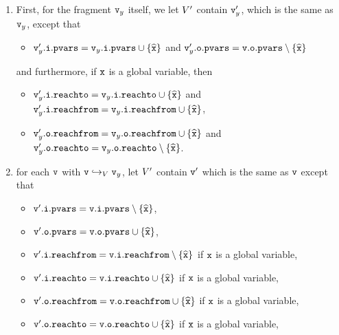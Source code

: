 \begin{enumerate}
\item
First, for the fragment $\mathtt{v}_y$ itself, we let $V'$ contain
$\mathtt{v}_y'$, which is the same as $\mathtt{v}_y$, except that
\begin{itemize}
\item $\mathtt{v}_y'.\mathtt{i}.\mathtt{pvars} = \mathtt{v}_y.\mathtt{i}.\mathtt{pvars} \cup \left\{\widehat{\mathtt{x}}\right\}$ and
  $\mathtt{v}_y'.\mathtt{o}.\mathtt{pvars} = \mathtt{v}.\mathtt{o}.\mathtt{pvars} \setminus \left\{\widehat{\mathtt{x}}\right\}$
\end{itemize}
and furthermore, if $\mathtt{x}$ is a global variable, then
{\small
  \begin{itemize}
\item $\mathtt{v}_y'.\mathtt{i}.\mathtt{reachto} = \mathtt{v}_y.\mathtt{i}.\mathtt{reachto} \cup \left\{\widehat{\mathtt{x}}\right\}$ and
$\mathtt{v}_y'.\mathtt{i}.\mathtt{reachfrom} = \mathtt{v}_y.\mathtt{i}.\mathtt{reachfrom} \cup \left\{\widehat{\mathtt{x}}\right\}$,
\item $\mathtt{v}_y'.\mathtt{o}.\mathtt{reachfrom} = \mathtt{v}_y.\mathtt{o}.\mathtt{reachfrom} \cup \left\{\widehat{\mathtt{x}}\right\}$ and
$\mathtt{v}_y'.\mathtt{o}.\mathtt{reachto} = \mathtt{v}_y.\mathtt{o}.\mathtt{reachto} \setminus \left\{\widehat{\mathtt{x}}\right\}$.
\end{itemize}
}
\item  for each $\mathtt{v}$ with $\mathtt{v} \hookrightarrow_{V} \mathtt{v}_y$, let $V'$ contain $\mathtt{v}'$ which is the same as $\mathtt{v}$ except that
\begin{itemize}
\item $\mathtt{v}'.\mathtt{i}.\mathtt{pvars} = \mathtt{v}.\mathtt{i}.\mathtt{pvars} \setminus \left\{\widehat{\mathtt{x}}\right\}$,
\item $\mathtt{v}'.\mathtt{o}.\mathtt{pvars} = \mathtt{v}.\mathtt{o}.\mathtt{pvars} \cup \left\{\widehat{\mathtt{x}}\right\}$,
\item $\mathtt{v}'.\mathtt{i}.\mathtt{reachfrom} = \mathtt{v}.\mathtt{i}.\mathtt{reachfrom} \setminus \left\{\widehat{\mathtt{x}}\right\}$ if $\tt x$ is a global variable,
\item $\mathtt{v}'.\mathtt{i}.\mathtt{reachto} = \mathtt{v}.\mathtt{i}.\mathtt{reachto} \cup \left\{\widehat{\mathtt{x}}\right\}$ if $\tt x$ is a global variable,
 \item $\mathtt{v}'.\mathtt{o}.\mathtt{reachfrom} = \mathtt{v}.\mathtt{o}.\mathtt{reachfrom} \cup \left\{\widehat{\mathtt{x}}\right\}$ if $\tt x$ is a global variable,
\item $\mathtt{v}'.\mathtt{o}.\mathtt{reachto} = \mathtt{v}.\mathtt{o}.\mathtt{reachto} \cup \left\{\widehat{\mathtt{x}}\right\}$ if $\tt x$ is a global variable,

\end{itemize}
\end{enumerate}
